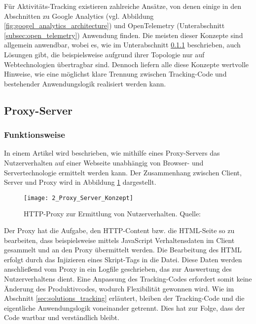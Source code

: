 Für Aktivitäts-Tracking existieren zahlreiche Ansätze, von denen einige in den Abschnitten zu Google Analytics (vgl. Abbildung \ref{fig:googel_analytics_architecture}) und OpenTelemetry (Unterabschnitt \ref{subsec:open_telemetry}) Anwendung finden. Die meisten dieser Konzepte sind allgemein anwendbar, wobei es, wie im Unterabschnitt \ref{subsec:proxy_server} beschrieben, auch Lösungen gibt, die beispielsweise aufgrund ihrer Topologie nur auf Webtechnologien übertragbar sind. Dennoch liefern alle diese Konzepte wertvolle Hinweise, wie eine möglichst klare Trennung zwischen Tracking-Code und bestehender Anwendungslogik realisiert werden kann.

\subsection{Proxy-Server}

\subsubsection{Funktionsweise}
\label{subsec:proxy_server}
In einem Artikel \cite{atterer2006knowing} wird beschrieben, wie mithilfe eines Proxy-Servers das Nutzerverhalten auf einer Webseite unabhängig von Browser- und Servertechnologie ermittelt werden kann. Der Zusammenhang zwischen Client, Server und Proxy wird in Abbildung \ref{fig:proxy_server_concept} dargestellt.

\begin{figure}[H]
\centering
\texttt{[image: 2\_Proxy\_Server\_Konzept]}
\caption{HTTP-Proxy zur Ermittlung von Nutzerverhalten. Quelle: \cite{atterer2006knowing}}
\label{fig:proxy_server_concept}
\end{figure}

Der Proxy hat die Aufgabe, den HTTP-Content bzw. die HTML-Seite so zu bearbeiten, dass beispielsweise mittels JavaScript Verhaltensdaten im Client gesammelt und an den Proxy übermittelt werden. Die Bearbeitung des HTML erfolgt durch das Injizieren eines Skript-Tags in die Datei. Diese Daten werden anschließend vom Proxy in ein Logfile geschrieben, das zur Auswertung des Nutzerverhaltens dient. Eine Anpassung des Tracking-Codes erfordert somit keine Änderung des Produktivcodes, wodurch Flexibilität gewonnen wird. Wie im Abschnitt \ref{sec:solutions_tracking} erläutert, bleiben der Tracking-Code und die eigentliche Anwendungslogik voneinander getrennt. Dies hat zur Folge, dass der Code wartbar und verständlich bleibt.

